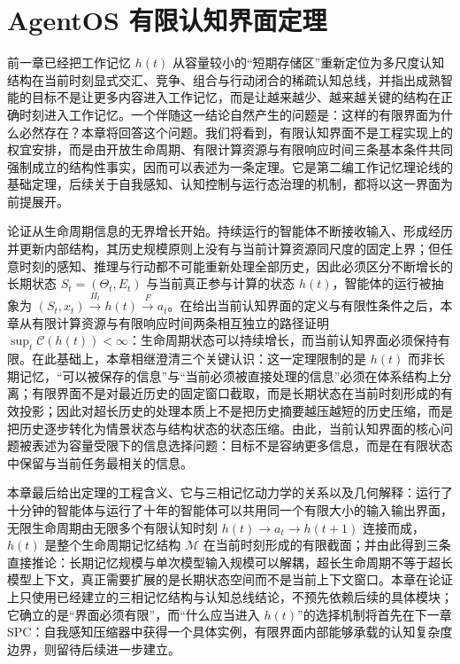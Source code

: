 \chapter{AgentOS 有限认知界面定理}

\begin{chapterlead}
前一章已经把工作记忆 $h(t)$ 从容量较小的``短期存储区''重新定位为多尺度认知结构在当前时刻显式交汇、竞争、组合与行动闭合的稀疏认知总线，并指出成熟智能的目标不是让更多内容进入工作记忆，而是让越来越少、越来越关键的结构在正确时刻进入工作记忆。一个伴随这一结论自然产生的问题是：这样的有限界面为什么必然存在？本章将回答这个问题。我们将看到，有限认知界面不是工程实现上的权宜安排，而是由开放生命周期、有限计算资源与有限响应时间三条基本条件共同强制成立的结构性事实，因而可以表述为一条定理。它是第二编工作记忆理论线的基础定理，后续关于自我感知、认知控制与运行态治理的机制，都将以这一界面为前提展开。

论证从生命周期信息的无界增长开始。持续运行的智能体不断接收输入、形成经历并更新内部结构，其历史规模原则上没有与当前计算资源同尺度的固定上界；但任意时刻的感知、推理与行动都不可能重新处理全部历史，因此必须区分不断增长的长期状态 $S_t=(\Theta_t,E_t)$ 与当前真正参与计算的状态 $h(t)$，智能体的运行被抽象为 $(S_t,x_t)\xrightarrow{\Pi_t}h(t)\xrightarrow{F}a_t$。在给出当前认知界面的定义与有限性条件之后，本章从有限计算资源与有限响应时间两条相互独立的路径证明 $\sup_t\mathcal{C}(h(t))<\infty$：生命周期状态可以持续增长，而当前认知界面必须保持有限。在此基础上，本章相继澄清三个关键认识：这一定理限制的是 $h(t)$ 而非长期记忆，``可以被保存的信息''与``当前必须被直接处理的信息''必须在体系结构上分离；有限界面不是对最近历史的固定窗口截取，而是长期状态在当前时刻形成的有效投影；因此对超长历史的处理本质上不是把历史摘要越压越短的历史压缩，而是把历史逐步转化为情景状态与结构状态的状态压缩。由此，当前认知界面的核心问题被表述为容量受限下的信息选择问题：目标不是容纳更多信息，而是在有限状态中保留与当前任务最相关的信息。

本章最后给出定理的工程含义、它与三相记忆动力学的关系以及几何解释：运行了十分钟的智能体与运行了十年的智能体可以共用同一个有限大小的输入输出界面，无限生命周期由无限多个有限认知时刻 $h(t)\to a_t\to h(t+1)$ 连接而成，$h(t)$ 是整个生命周期记忆结构 $\mathcal{M}$ 在当前时刻形成的有限截面；并由此得到三条直接推论：长期记忆规模与单次模型输入规模可以解耦，超长生命周期不等于超长模型上下文，真正需要扩展的是长期状态空间而不是当前上下文窗口。本章在论证上只使用已经建立的三相记忆结构与认知总线结论，不预先依赖后续的具体模块；它确立的是``界面必须有限''，而``什么应当进入 $h(t)$''的选择机制将首先在下一章 SPC：自我感知压缩器中获得一个具体实例，有限界面内部能够承载的认知复杂度边界，则留待后续进一步建立。
\end{chapterlead}

